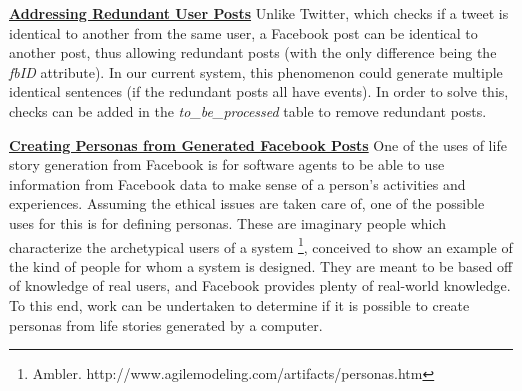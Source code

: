\underline{\textbf{Addressing Redundant User Posts}} \newline
Unlike Twitter, which checks if a tweet is identical to another from the same user, a Facebook post can be identical to another post, thus allowing redundant posts (with the only difference being the \textit{fbID} attribute). In our current system, this phenomenon could generate multiple identical sentences (if the redundant posts all have events). In order to solve this, checks can be added in the \textit{to\_be\_processed} table to remove redundant posts.

\underline{\textbf{Creating Personas from Generated Facebook Posts}} \newline
One of the uses of life story generation from Facebook is for software agents to be able to use information from Facebook data to make sense of a person's activities and experiences. Assuming the ethical issues are taken care of, one of the possible uses for this is for defining personas. These are imaginary people which characterize the archetypical users of a system \footnote{Ambler. http://www.agilemodeling.com/artifacts/personas.htm}, conceived to show an example of the kind of people for whom a system is designed. They are meant to be based off of knowledge of real users, and Facebook provides plenty of real-world knowledge. To this end, work can be undertaken to determine if it is possible to create personas from life stories generated by a computer.
